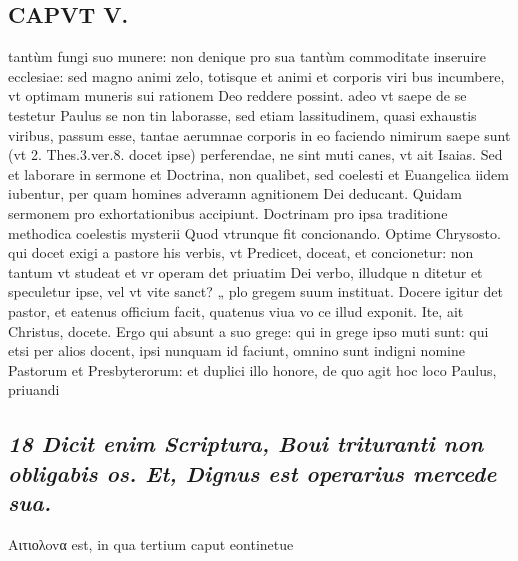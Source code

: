 \documentclass{article}
\begin{document}
\begin{pages}
\section*{CAPVT  V. }
\marginpar{[ p.309 ]}\pstart tantùm fungi suo munere: non denique pro sua tantùm commoditate inseruire ecclesiae: sed magno animi zelo, totisque et animi et corporis viri bus incumbere, vt optimam muneris sui rationem Deo reddere possint. adeo vt saepe de se testetur Paulus se non tin laborasse, sed etiam lassitudinem, quasi exhaustis viribus, passum esse, tantae aerumnae corporis in eo faciendo nimirum saepe sunt (vt 2. Thes.3.ver.8. docet ipse) perferendae, ne sint muti canes, vt ait Isaias. Sed et laborare in sermone et Doctrina, non qualibet, sed coelesti et Euangelica iidem iubentur, per quam homines adveramn agnitionem Dei deducant. Quidam sermonem pro exhortationibus accipiunt. Doctrinam pro ipsa traditione methodica coelestis mysterii Quod vtrunque fit concionando. Optime Chrysosto. qui docet exigi a pastore his verbis, vt Predicet, doceat, et concionetur: non tantum vt studeat et vr operam det priuatim Dei verbo, illudque n ditetur et speculetur ipse, vel vt vite sanct? „ plo gregem suum instituat. Docere igitur det pastor, et eatenus officium facit, quatenus viua vo ce illud exponit. Ite, ait Christus, docete. Ergo qui absunt a suo grege: qui in grege ipso muti sunt: qui etsi per alios docent, ipsi nunquam id faciunt, omnino sunt indigni nomine Pastorum et Presbyterorum: et duplici illo honore, de quo agit hoc loco Paulus, priuandi  \pend
{}
{}
\subsection*{\textit{18 Dicit enim Scriptura, Boui trituranti non obligabis os. Et, Dignus est operarius mercede sua. }}\pstart Αιτιολovα est, in qua tertium caput eontinetue  \pend

\end{pages}
\end{document}
